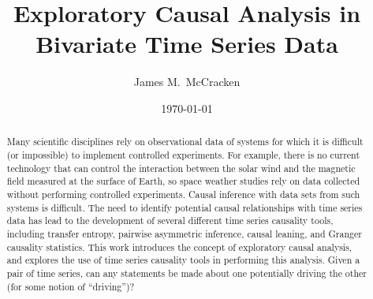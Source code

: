 \documentclass{article}[10pt]
\title{Exploratory Causal Analysis in Bivariate Time Series Data}
\author{James M.\ McCracken}
\date{\today}
\begin{document}
\maketitle
\begin{abstract}
Many scientific disciplines rely on observational data of systems for which it is difficult (or impossible) to implement controlled experiments. For example, there is no current technology that can control the interaction between the solar wind and the magnetic field measured at the surface of Earth, so space weather studies rely on data collected without performing controlled experiments.  Causal inference with data sets from such systems is difficult.   The need to identify potential causal relationships with time series data has lead to the development of several different time series causality tools, including transfer entropy, pairwise asymmetric inference, causal leaning, and Granger causality statistics.  This work introduces the concept of exploratory causal analysis, and explores the use of time series causality tools in performing this analysis.  Given a pair of time series, can any statements be made about one potentially driving the other (for some notion of ``driving'')? 
\end{abstract}
\tableofcontents
\end{document}
